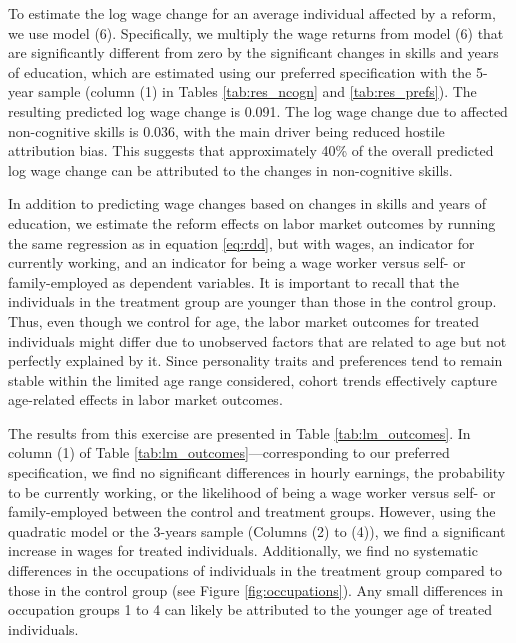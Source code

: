 To estimate the log wage change for an average individual affected by a reform, we use model (6). Specifically, we multiply the wage returns from model (6) that are significantly different from zero by the significant changes in skills and years of education, which are estimated using our preferred specification with the 5-year sample (column (1) in Tables \ref{tab:res_ncogn} and \ref{tab:res_prefs}). The resulting predicted log wage change is 0.091.
%
The log wage change due to affected non-cognitive skills is
%
0.036, with the main driver being reduced hostile attribution bias. This suggests that approximately 40\% of the overall predicted log wage change can be attributed to the changes in non-cognitive skills.

In addition to predicting wage changes based on changes in skills and years of education, we estimate the reform effects on labor market outcomes by running the same regression as in equation \ref{eq:rdd}, but with wages, an indicator for currently working, and an indicator for being a wage worker versus self- or family-employed as dependent variables. It is important to recall that the individuals in the treatment group are younger than those in the control group. Thus, even though we control for age, the labor market outcomes for treated individuals might differ due to unobserved factors that are related to age but not perfectly explained by it. Since personality traits and preferences tend to remain stable within the limited age range considered, cohort trends effectively capture age-related effects in labor market outcomes.

The results from this exercise are presented in Table \ref{tab:lm_outcomes}. In column (1) of Table \ref{tab:lm_outcomes}---corresponding to our preferred specification, we find no significant differences in hourly earnings, the probability to be currently working, or the likelihood of being a wage worker versus self- or family-employed between the control and treatment groups. However, using the quadratic model or the 3-years sample (Columns (2) to (4)), we find a significant increase in wages for treated individuals.
Additionally, we find no systematic differences in the occupations of individuals in the treatment group compared to those in the control group (see Figure \ref{fig:occupations}). Any small differences in occupation groups 1 to 4 can likely be attributed to the younger age of treated individuals.
